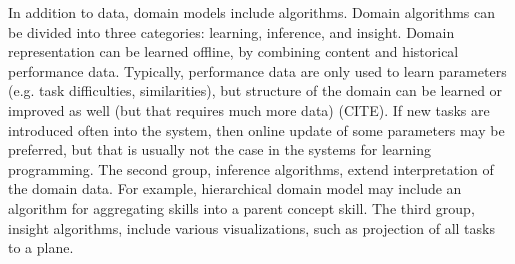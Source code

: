 %
%
%


In addition to data, domain models include algorithms. Domain algorithms can be
divided into three categories: learning, inference, and insight.
Domain representation can be learned offline, by combining content and historical
performance data. Typically, performance data are only used to learn parameters
(e.g. task difficulties, similarities), but structure of the domain can be learned
or improved as well (but that requires much more data) (CITE). If new tasks are
introduced often into the system, then online update of some parameters may be
preferred, but that is usually not the case in the systems for learning
programming.
The second group, inference algorithms, extend interpretation of the domain data.
For example, hierarchical domain model may include an algorithm for
aggregating skills into a parent concept skill. %
The third group, insight algorithms, include various visualizations,
such as projection of all tasks to a plane. %



